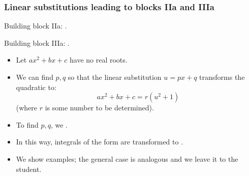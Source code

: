 \begin{frame}
\frametitle{Linear substitutions leading to blocks IIa and IIIa}
Building block IIa: .

Building block IIIa: .

\begin{itemize}

\item<1-> Let $ax^2+bx+c$ have no real roots.
\item<2-> We can find $p,q$ so that the linear substitution $u=px+q$ transforms the quadratic to:
\[
ax^2+bx+c= r(u^2+1)
\]
(where $r$ is some number to be determined).
\item<3-> To find $p,q$, we .
\item<4-> In this way, integrals of the form  are transformed to .

\item<5-> We show examples; the general case is analogous and we leave it to the student.
\end{itemize}
\vspace{5cm}
\end{frame}
